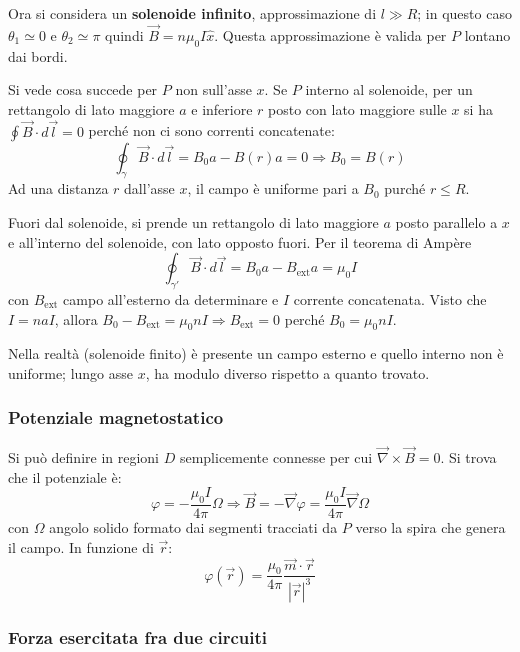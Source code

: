 \documentclass[a4paper]{scrartcl}
\numberwithin{equation}{subsection}
\theoremstyle{style1}
\begin{document}
Ora si considera un \textbf{solenoide infinito}, approssimazione di $l \gg R$; in questo caso $\theta_1 \simeq 0$ e $\theta_2 \simeq \pi$ quindi $\vec{B} = n \mu_0 I \hat{x}$. Questa approssimazione \`e valida per $P$ lontano dai bordi.

Si vede cosa succede per $P$ non sull'asse $x$. Se $P$ interno al solenoide, per un rettangolo di lato maggiore $a$ e inferiore $r$ posto con lato maggiore sulle $x$ si ha $\oint \vec{B}\cdot d\vec{l}=0$ perch\'e non ci sono correnti concatenate:
\begin{equation}
	\oint_{\gamma} \vec{B}\cdot d\vec{l} = B_0 a - B(r) a = 0 \Rightarrow B_0 = B(r) 
\end{equation}
Ad una distanza $r$ dall'asse $x$, il campo \`e uniforme pari a $B_0$ purch\'e $r\le R$.

Fuori dal solenoide, si prende un rettangolo di lato maggiore $a$ posto parallelo a $x$ e all'interno del solenoide, con lato opposto fuori. Per il teorema di Amp\`ere
\begin{equation}
	\oint_{\gamma'}  \vec{B}\cdot d\vec{l} = B_0a - B_\text{ext}a = \mu_0 I 
\end{equation}
con $B_\text{ext}$ campo all'esterno da determinare e $I$ corrente concatenata. Visto che $I= naI$, allora $B_0 - B_\text{ext}=\mu_0 n I \Rightarrow B_\text{ext}=0$ perch\'e $B_0 = \mu_0 n I$. 

Nella realt\`a (solenoide finito) \`e presente un campo esterno e quello interno non \`e uniforme; lungo asse $x$, ha modulo diverso rispetto a quanto trovato.
\subsubsection{Potenziale magnetostatico}

Si pu\`o definire in regioni $D$ semplicemente connesse per cui $\vec{\nabla }\times \vec{B} = 0$. Si trova che il potenziale \`e:
\begin{equation}
	\varphi  = - \frac{\mu_0 I}{4 \pi }\Omega \Rightarrow \vec{B} = - \vec{\nabla }\varphi = \frac{\mu_0 I }{4 \pi } \vec{\nabla }\Omega 
\end{equation}
con $\Omega $ angolo solido formato dai segmenti tracciati da $P$ verso la spira che genera il campo. In funzione di $\vec{r}$:
\begin{equation}
	\varphi (\vec{r} ) = \frac{\mu_0}{4 \pi }\frac{\vec{m}\cdot \vec{r}}{\left\lvert \vec{r} \right\rvert ^3}
\end{equation}
\subsubsection{Forza esercitata fra due circuiti}
\end{document}
